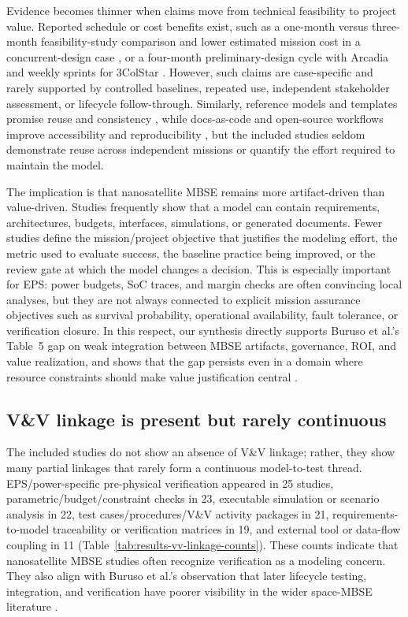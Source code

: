 Evidence becomes thinner when claims move from technical feasibility to project value.  Reported schedule or cost benefits exist, such as a one-month versus three-month feasibility-study comparison and lower estimated mission cost in a concurrent-design case \cite{paper-0061}, or a four-month preliminary-design cycle with Arcadia and weekly sprints for 3ColStar \cite{paper-0078}.  However, such claims are case-specific and rarely supported by controlled baselines, repeated use, independent stakeholder assessment, or lifecycle follow-through.  Similarly, reference models and templates promise reuse and consistency \cite{paper-0011,paper-0015,paper-0077}, while docs-as-code and open-source workflows improve accessibility and reproducibility \cite{paper-0037,paper-0029}, but the included studies seldom demonstrate reuse across independent missions or quantify the effort required to maintain the model.

The implication is that nanosatellite MBSE remains more artifact-driven than value-driven.  Studies frequently show that a model can contain requirements, architectures, budgets, interfaces, simulations, or generated documents.  Fewer studies define the mission/project objective that justifies the modeling effort, the metric used to evaluate success, the baseline practice being improved, or the review gate at which the model changes a decision.  This is especially important for EPS: power budgets, SoC traces, and margin checks are often convincing local analyses, but they are not always connected to explicit mission assurance objectives such as survival probability, operational availability, fault tolerance, or verification closure.  In this respect, our synthesis directly supports Buruso et al.'s Table~5 gap on weak integration between MBSE artifacts, governance, ROI, and value realization, and shows that the gap persists even in a domain where resource constraints should make value justification central \cite{Buruso2026MBSESpace}.

\subsection{V\&V linkage is present but rarely continuous}
\label{sec:discussion-vv-continuity}

The included studies do not show an absence of V\&V linkage; rather, they show many partial linkages that rarely form a continuous model-to-test thread.  EPS/power-specific pre-physical verification appeared in 25 studies, parametric/budget/constraint checks in 23, executable simulation or scenario analysis in 22, test cases/procedures/V\&V activity packages in 21, requirements-to-model traceability or verification matrices in 19, and external tool or data-flow coupling in 11 (Table~\ref{tab:results-vv-linkage-counts}).  These counts indicate that nanosatellite MBSE studies often recognize verification as a modeling concern.  They also align with Buruso et al.'s observation that later lifecycle testing, integration, and verification have poorer visibility in the wider space-MBSE literature \cite{Buruso2026MBSESpace}.

